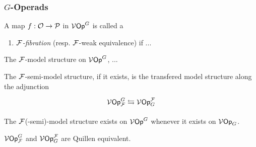 \documentclass[a4paper,10pt]{article}%
\begin{document}



















\subsubsection{$G$-Operads}
\begin{definition}
  A map $f: \mathcal{O} \to \mathcal{P}$ in $\mathcal V\mathsf{Op}^G$ is called a 
  \begin{enumerate}
  \item \textit{$\mathcal F$-fibration} (resp. $\mathcal F$-weak equivalence) if ...
  \end{enumerate}
\end{definition}
\begin{definition}
  The $\mathcal F$-model structure on $\mathcal V\mathsf{Op}^G$, ...
\end{definition}

\begin{lemma}
  The $\mathcal F$-semi-model structure, if it exists, is the transfered model structure along the adjunction
  \[
  \begin{tikzcd}
    \V\Op^G_\F \leftrightarrows \V\Op_G^\F
  \end{tikzcd}
  \]
\end{lemma}
\begin{corollary}
  The $\mathcal F$(-semi)-model structure exists on $\mathcal V\mathsf{Op}^G$ whenever it exists on $\mathcal V\mathsf{Op}_G$.
\end{corollary}
\begin{theorem}
  $\mathcal V\mathsf{Op}^G_{\mathcal F}$ and $\mathcal V\mathsf{Op}_G^{\mathcal F}$ are Quillen equivalent.
\end{theorem}
\end{document}
